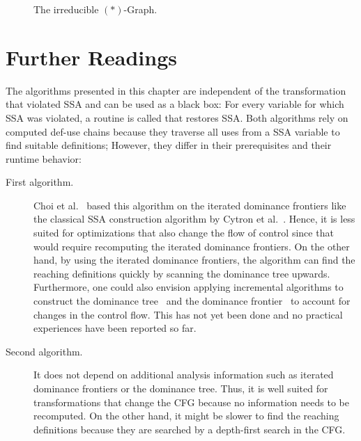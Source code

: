 {\begin{figure}
    \hfil{}\hfil\strut
    \caption{The irreducible $(\ast)$-Graph.}
    \label{fig:astgraph}
\end{figure}


\section{Further Readings}


The algorithms presented in this chapter are independent of the transformation that violated SSA and can be used as a black box:
For every variable for which SSA was violated, a routine is called that restores SSA.
Both algorithms rely on computed def-use chains because they traverse all uses from a SSA variable to find suitable definitions;
However, they differ in their prerequisites and their runtime behavior:
\begin{description}
	\item[First algorithm.]
		Choi et al.~\cite{Choi:1996ji} based this algorithm on the iterated dominance frontiers like the classical SSA construction algorithm by Cytron et al.~\cite{cytron:1991:ssa}.
		Hence, it is less suited for optimizations that also change the flow of control since that would require recomputing the iterated dominance frontiers.
		On the other hand, by using the iterated dominance frontiers, the algorithm can find the reaching definitions quickly by scanning the dominance tree upwards.
		Furthermore, one could also envision applying incremental algorithms to construct the dominance tree~\cite{Ramalingam:1994iq,Sreedhar:1995:ICD:202529.202531} and the dominance frontier~\cite{Sreedhar:1996:PLDI} to account for changes in the control flow.
		This has not yet been done and no practical experiences have been reported so far.

	\item[Second algorithm.]
		It does not depend on additional analysis information such as iterated dominance frontiers or the dominance tree.
		Thus, it is well suited for transformations that change the CFG because no information needs to be recomputed.
		On the other hand, it might be slower to find the reaching definitions because they are searched by a depth-first search in the CFG.
\end{description}

}
